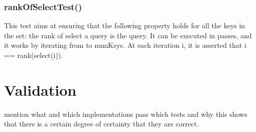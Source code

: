 \subsection{{\ttfamily rankOfSelectTest()}}

This test aims at ensuring that the following property holds for all the keys in the set: the rank of select a query is the query. It can be executed in passes, and it works by iterating from {} to {\ttfamily numKeys}. At each iteration {\ttfamily i}, it is asserted that {\ttfamily i == rank(select(i))}.

\chapter{Validation}

mention what and which implementations pass which tests and why this shows that there is a certain degree of certainty that they are correct.
